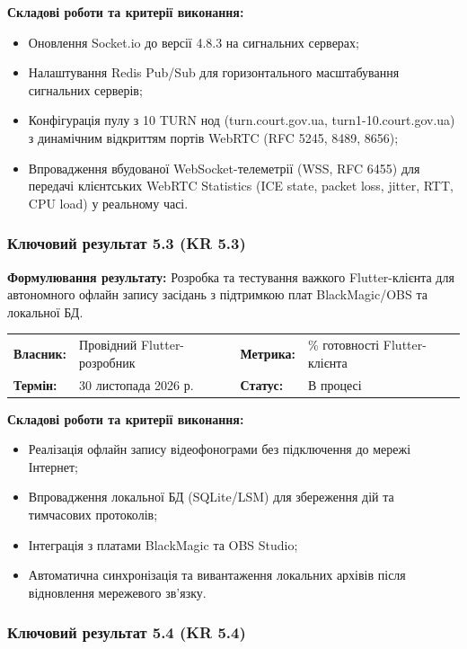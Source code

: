 \documentclass{article}
\begin{document}
\vspace{10pt}
\textbf{Складові роботи та критерії виконання:}
\begin{itemize}
    \item Оновлення Socket.io до версії 4.8.3 на сигнальних серверах;
    \item Налаштування Redis Pub/Sub для горизонтального масштабування сигнальних серверів;
    \item Конфігурація пулу з 10 TURN нод (turn.court.gov.ua, turn1-10.court.gov.ua) з динамічним відкриттям портів WebRTC (RFC 5245, 8489, 8656);
    \item Впровадження вбудованої WebSocket-телеметрії (WSS, RFC 6455) для передачі клієнтських WebRTC Statistics (ICE state, packet loss, jitter, RTT, CPU load) у реальному часі.
\end{itemize}

\subsubsection{Ключовий результат 5.3 (KR 5.3)}

\textbf{Формулювання результату:} Розробка та тестування важкого Flutter-клієнта для автономного офлайн запису засідань з підтримкою плат BlackMagic/OBS та локальної БД.

\noindent\begin{tabular}{@{}p{2.2cm}p{4.5cm}p{2.2cm}p{4.5cm}@{}}
\toprule
\textbf{Власник:} & Провідний Flutter-розробник & \textbf{Метрика:} & \% готовності Flutter-клієнта \\
\textbf{Термін:} & 30 листопада 2026 р. & \textbf{Статус:} & В процесі \\
\bottomrule
\end{tabular}

\vspace{10pt}
\textbf{Складові роботи та критерії виконання:}
\begin{itemize}
    \item Реалізація офлайн запису відеофонограми без підключення до мережі Інтернет;
    \item Впровадження локальної БД (SQLite/LSM) для збереження дій та тимчасових протоколів;
    \item Інтеграція з платами BlackMagic та OBS Studio;
    \item Автоматична синхронізація та вивантаження локальних архівів після відновлення мережевого зв'язку.
\end{itemize}

\subsubsection{Ключовий результат 5.4 (KR 5.4)}
\end{document}
